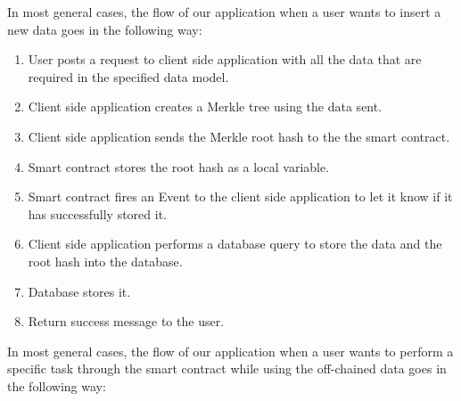 In most general cases, the flow of our application when a user wants to insert a new data goes in the following way: 

\begin{enumerate}
	\item User posts a request to client side application with all the data that are required in the specified data model. 
	\item Client side application creates a Merkle tree using the data sent.
	\item Client side application sends the Merkle root hash to the the smart contract.
	\item Smart contract stores the root hash as a local variable.
	\item Smart contract fires an Event to the client side application to let it know if it has successfully stored it. 
	\item Client side application performs a database query to store the data and the root hash into the database.
	\item Database stores it.
	\item Return success message to the user. 
\end{enumerate}

In most general cases, the flow of our application when a user wants to perform a specific task through the smart contract while using the off-chained data goes in the following way:

